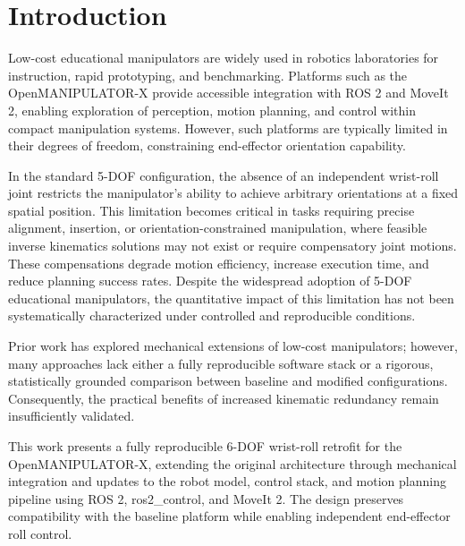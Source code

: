 \documentclass[conference]{IEEEtran}
\begin{document}
	
	\section{Introduction}
	
	
	Low-cost educational manipulators are widely used in robotics laboratories for instruction, rapid prototyping, and benchmarking. Platforms such as the OpenMANIPULATOR-X provide accessible integration with ROS 2 and MoveIt 2, enabling exploration of perception, motion planning, and control within compact manipulation systems. However, such platforms are typically limited in their degrees of freedom, constraining end-effector orientation capability.
	
	In the standard 5-DOF configuration, the absence of an independent wrist-roll joint restricts the manipulator’s ability to achieve arbitrary orientations at a fixed spatial position. This limitation becomes critical in tasks requiring precise alignment, insertion, or orientation-constrained manipulation, where feasible inverse kinematics solutions may not exist or require compensatory joint motions. These compensations degrade motion efficiency, increase execution time, and reduce planning success rates. Despite the widespread adoption of 5-DOF educational manipulators, the quantitative impact of this limitation has not been systematically characterized under controlled and reproducible conditions.
	
	Prior work has explored mechanical extensions of low-cost manipulators; however, many approaches lack either a fully reproducible software stack or a rigorous, statistically grounded comparison between baseline and modified configurations. Consequently, the practical benefits of increased kinematic redundancy remain insufficiently validated.
	
	This work presents a fully reproducible 6-DOF wrist-roll retrofit for the OpenMANIPULATOR-X, extending the original architecture through mechanical integration and updates to the robot model, control stack, and motion planning pipeline using ROS 2, ros2\_control, and MoveIt 2. The design preserves compatibility with the baseline platform while enabling independent end-effector roll control.
	
\end{document}
